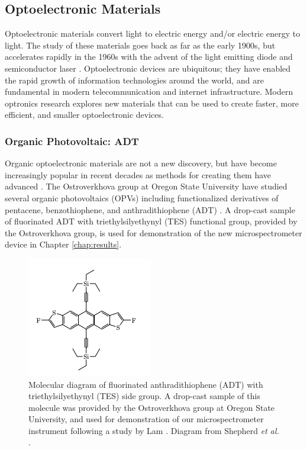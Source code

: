 \subsection{Optoelectronic Materials}

Optoelectronic materials convert light to electric energy and/or electric energy to light. The study of these materials goes back as far as the early 1900s, but accelerates rapidly in the 1960s with the advent of the light emitting diode and semiconductor laser \cite{sweeney_optoelectronic_2017}. Optoelectronic devices are ubiquitous; they have enabled the rapid growth of information technologies around the world, and are fundamental in modern telecommunication and internet infrastructure. Modern optronics research explores new materials that can be used to create faster, more efficient, and smaller optoelectronic devices.

\subsubsection{Organic Photovoltaic: ADT}

Organic optoelectronic materials are not a new discovery, but have become increasingly popular in recent decades as methods for creating them have advanced \cite{ostroverkhova_organic_2016}. The Ostroverkhova group at Oregon State University have studied several organic photovoltaics (OPVs) including functionalized derivatives of pentacene, benzothiophene, and anthradithiophene (ADT) \cite{shepherd_optical_2010, e._b._shepherd_effect_2011, platt_optical_2009}. A drop-cast sample of fluorinated ADT with triethylsilyethynyl (TES) functional group, provided by the Ostroverkhova group, is used for demonstration of the new microspectrometer device in Chapter \ref{chap:results}.

\begin{figure}[H]
    \centering
    \includegraphics{img/adt-tes-f.png}
    \caption[Molecular diagram of ADT TES-F.]{Molecular diagram of fluorinated anthradithiophene (ADT) with triethylsilyethynyl (TES) side group. A drop-cast sample of this molecule was provided by the Ostroverkhova group at Oregon State University, and used for demonstration of our microspectrometer instrument following a study by Lam \cite{lam_polarization_2018}. Diagram from Shepherd \emph{et al.} \cite{shepherd_optical_2010}.}
    \label{fig:adt-diagram}
\end{figure}

